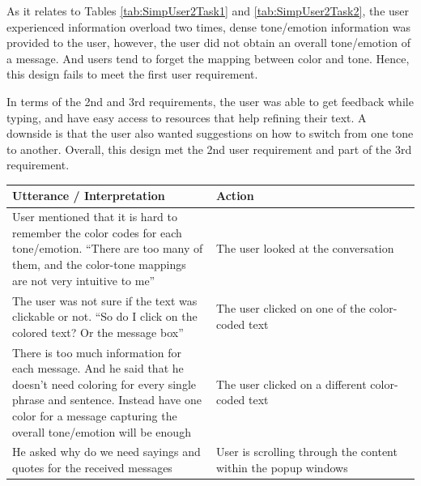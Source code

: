 \documentclass[acmsmall,screen,authorversion,nonacm]{acmart}
\begin{document}
As it relates to Tables \ref{tab:SimpUser2Task1} and \ref{tab:SimpUser2Task2}, the user experienced information overload two times, dense tone/emotion information was provided to the user, however, the user did not obtain an overall tone/emotion of a message. And users tend to forget the mapping between color and tone. Hence, this design fails to meet the first user requirement. 

In terms of the 2nd and 3rd requirements, the user was able to get feedback while typing, and have easy access to resources that help refining their text. A downside is that the user also wanted suggestions on how to switch from one tone to another. Overall, this design met the 2nd user requirement and part of the 3rd requirement. 

\begin{table}[H]
\begin{tabular}{|p{0.5 \linewidth}|p{0.5 \linewidth}|}
\hline
Utterance / Interpretation                                                                                                                                                                                             & Action                                                                                      \\ \hline
User mentioned that it is hard to remember the color codes for each tone/emotion. “There are too many of them, and the color-tone mappings are not very intuitive to me”                                               & The user looked at the conversation                                                         \\ \hline
The user was not sure if the text was clickable or not. “So do I click on the colored text? Or the message box”                                                                                                        & The user clicked on one of the color-coded text                                             \\ \hline
There is too much information for each message. And he said that he doesn’t need coloring for every single phrase and sentence. Instead have one color for a message capturing the overall tone/emotion will be enough & The user clicked on a different color-coded text                                            \\ \hline
He asked why do we need sayings and quotes for the received messages                                                                                                                                                   & User is scrolling through the content within the popup windows                              \\ \hline

\end{tabular}
\end{table}
\end{document}
